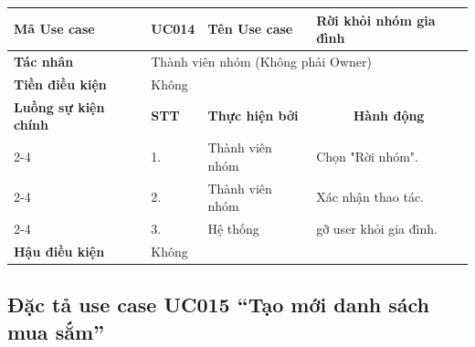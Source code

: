 \documentclass[../main.tex]{subfiles}
\begin{document}
\begin{longtable}{|p{2.7cm}|p{0.8cm}|p{2.6cm}|p{7.3cm}|}
\hline
\cellcolor[HTML]{D5F5E3}\textbf{Mã Use case} & \multicolumn{1}{l|}{UC014} & \cellcolor[HTML]{D5F5E3}\textbf{Tên Use case} & Rời khỏi nhóm gia đình \\ \hline
\cellcolor[HTML]{D5F5E3}\textbf{Tác nhân} & \multicolumn{3}{p{10.7cm}|}{Thành viên nhóm (Không phải Owner)} \\ \hline
\cellcolor[HTML]{D5F5E3}\textbf{Tiền điều kiện} & \multicolumn{3}{p{10.7cm}|}{Không} \\ \hline

\cellcolor[HTML]{D5F5E3}\textbf{Luồng sự kiện chính} & \cellcolor[HTML]{FDEBD0}\textbf{STT} & \cellcolor[HTML]{FDEBD0}\textbf{Thực hiện bởi} & \multicolumn{1}{c|}{\cellcolor[HTML]{FDEBD0}\textbf{Hành động}} \\ \cline{2-4} 
\cellcolor[HTML]{D5F5E3} & 1. & Thành viên nhóm & Chọn "Rời nhóm". \\ \cline{2-4} 
\cellcolor[HTML]{D5F5E3} & 2. & Thành viên nhóm & Xác nhận thao tác. \\ \cline{2-4} 
\cellcolor[HTML]{D5F5E3} & 3. & Hệ thống & gỡ user khỏi gia đình. \\ \hline

\cellcolor[HTML]{D5F5E3}\textbf{Hậu điều kiện} & \multicolumn{3}{p{10.7cm}|}{Không} \\ \hline
\end{longtable}
\endgroup

\subsection{Đặc tả use case UC015 ``Tạo mới danh sách mua sắm''}
\vspace{0.5cm}

\begingroup
\renewcommand{\arraystretch}{1.5}
\end{document}
